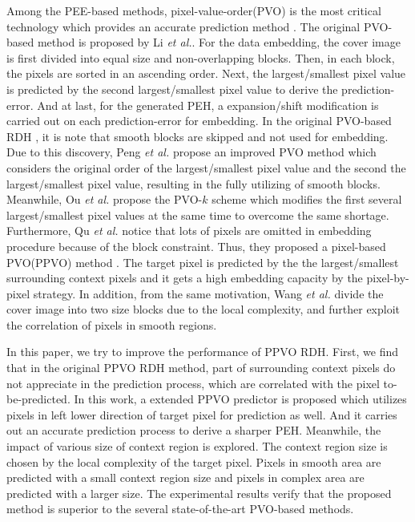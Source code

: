 \documentclass[review,3p,10pt,sort&compress]{elsarticle}
\begin{document}
Among the PEE-based methods, pixel-value-order(PVO) is the most critical technology which provides an accurate prediction method \cite{
Li2013PVO,
Peng2014IPVO,
Ou2014PVOk,
Qu2015PPVO,
Xiang2015A,
Bo2016Improved,
Weng2016Reversible,
Weng2017Optimal,
He2018Reversible}.
The original PVO-based method \cite{Li2013PVO} is proposed by Li \emph{et al.}. For the data embedding, the cover image is first divided into equal size and non-overlapping blocks. Then, in each block, the pixels are sorted in an ascending order. Next, the largest/smallest pixel value is predicted by the second largest/smallest pixel value to derive the prediction-error. And at last, for the generated PEH, a expansion/shift modification is carried out on each prediction-error for embedding. In the original PVO-based RDH \cite{Li2013PVO} , it is note that smooth blocks are skipped and not used for embedding. Due to this discovery, Peng \emph{et al.} propose an improved PVO method \cite{Peng2014IPVO} which considers the original order of the largest/smallest pixel value and the second the largest/smallest pixel value, resulting in the fully utilizing of smooth blocks. Meanwhile, Ou \emph{et al.} propose the PVO-$k$ scheme \cite{Ou2014PVOk} which modifies the first several largest/smallest pixel values at the same time to overcome the same shortage. Furthermore, Qu \emph{et al.} notice that lots of pixels are omitted in embedding procedure because of the block constraint. Thus, they proposed a pixel-based PVO(PPVO) method \cite{Qu2015PPVO}. The target pixel is predicted by the the largest/smallest surrounding context pixels and it gets a high embedding capacity by the pixel-by-pixel strategy.
In addition, from the same motivation, Wang \emph{et al.} \cite{Xiang2015A} divide the cover image into two size blocks due to the local complexity, and further exploit the correlation of pixels in smooth regions.

In this paper, we try to improve the performance of PPVO RDH. First, we find that in the original PPVO RDH method, part of surrounding context pixels do not appreciate in the prediction process, which are correlated with the pixel to-be-predicted. In this work, a extended PPVO predictor is proposed which utilizes pixels in left lower direction of target pixel for prediction as well. And it carries out an accurate prediction process to derive a sharper PEH. Meanwhile, the impact of various size of context region is explored. The context region size is chosen by the local complexity of the target pixel. Pixels in smooth area are predicted with a small context region size and pixels in complex area are predicted with a larger size. The experimental results verify that the proposed method is superior to the several state-of-the-art PVO-based methods.
\end{document}
